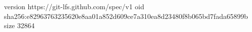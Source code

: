 version https://git-lfs.github.com/spec/v1
oid sha256:e82963763235620e8aa01a852d609ce7a310ea8d23480f8b065bd7fada65899b
size 32864
